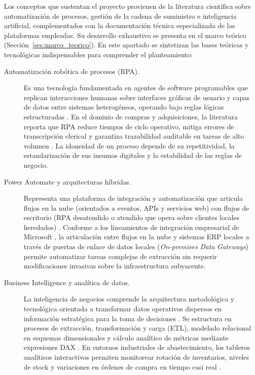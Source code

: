 Los conceptos que sustentan el proyecto provienen de la literatura científica sobre automatización de procesos, gestión de la cadena de suministro e inteligencia artificial, complementados con la documentación técnica especializada de las plataformas empleadas. Su desarrollo exhaustivo se presenta en el marco teórico (Sección~\ref{sec:marco_teorico}). En este apartado se sintetizan las bases teóricas y tecnológicas indispensables para comprender el planteamiento:

\begin{description}

\item[Automatización robótica de procesos (RPA).] Es una tecnología fundamentada en agentes de software programables que replican interacciones humanas sobre interfaces gráficas de usuario y capas de datos entre sistemas heterogéneos, operando bajo reglas lógicas estructuradas \cite{syed2020rpa}. En el dominio de compras y adquisiciones, la literatura reporta que RPA reduce tiempos de ciclo operativo, mitiga errores de transcripción clerical y garantiza trazabilidad auditable en tareas de alto volumen \cite{flechsig2022rpa, moreira2023rpa}. La idoneidad de un proceso depende de su repetitividad, la estandarización de sus insumos digitales y la estabilidad de las reglas de negocio.

\item[Power Automate y arquitecturas híbridas.] Representa una plataforma de integración y automatización que articula flujos en la nube (orientados a eventos, APIs y servicios web) con flujos de escritorio (RPA desatendido o atendido que opera sobre clientes locales heredados) \cite{microsoft2025powerAutomateDoc, microsoft2025desktopFlowsIntro}. Conforme a los lineamientos de integración empresarial de Microsoft \cite{microsoft2025gateway}, la articulación entre flujos en la nube y sistemas ERP locales a través de puertas de enlace de datos locales (\emph{On-premises Data Gateways}) permite automatizar tareas complejas de extracción sin requerir modificaciones invasivas sobre la infraestructura subyacente.

\item[Business Intelligence y analítica de datos.] La inteligencia de negocios comprende la arquitectura metodológica y tecnológica orientada a transformar datos operativos dispersos en información estratégica para la toma de decisiones \cite{sharda2020analytics}. Se estructura en procesos de extracción, transformación y carga (ETL), modelado relacional en esquemas dimensionales y cálculo analítico de métricas mediante expresiones DAX \cite{microsoft2025pbiTransform, popovic2012bi}. En entornos industriales de abastecimiento, los tableros analíticos interactivos permiten monitorear rotación de inventarios, niveles de stock y variaciones en órdenes de compra en tiempo casi real \cite{wixom2010bi}.


\end{description}
